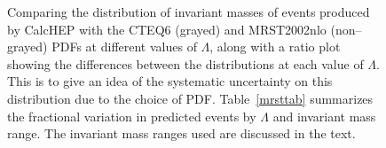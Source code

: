 \begin{figure}[htp]
\begin{minipage}[b]{.69\textwidth}
\begin{infilsf}\tiny

\end{infilsf}
\end{minipage}
\begin{minipage}[b]{.3\textwidth}
\caption{Comparing the distribution of invariant masses of events produced by CalcHEP with the CTEQ6 (grayed) and MRST2002nlo (non--grayed) PDFs at different values of $\Lambda$, along with a ratio plot showing the differences between the distributions at each value of $\Lambda$. This is to give an idea of the systematic uncertainty on this distribution due to the choice of PDF. Table~\ref{mrsttab} summarizes the fractional variation in predicted events by $\Lambda$ and invariant mass range. The invariant mass ranges used are discussed in the text. \label{mrst}}
\end{minipage}
\end{figure}
